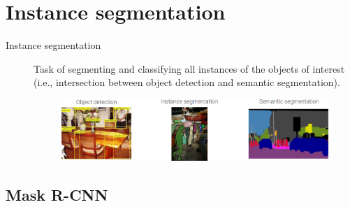 \section{Instance segmentation}

\begin{description}
    \item[Instance segmentation] 
        Task of segmenting and classifying all instances of the objects of interest (i.e., intersection between object detection and semantic segmentation).

        \begin{figure}[H]
            \centering
            \includegraphics[width=0.7\linewidth]{./img/obj_detection_and_segmentation.png}
        \end{figure}
\end{description}


\subsection{Mask R-CNN}


